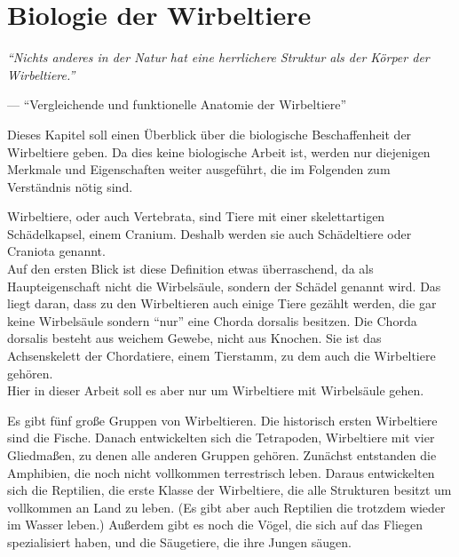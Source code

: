 \chapter{Biologie der Wirbeltiere}
\label{chapter:biology}

\begin{center}
 \begin{minipage}{12cm}
  \emph{"`Nichts anderes in der Natur hat eine herrlichere Struktur als der Körper der Wirbeltiere."'}
 
  --- "`Vergleichende und funktionelle Anatomie der Wirbeltiere"' \cite[S.\ 1]{Vergleichende_Anatomie}
 \end{minipage}
\end{center}

Dieses Kapitel soll einen Überblick über die biologische Beschaffenheit der Wirbeltiere geben. Da dies keine biologische Arbeit ist, werden nur diejenigen Merkmale und Eigenschaften weiter ausgeführt, die im Folgenden zum Verständnis nötig sind.

Wirbeltiere, oder auch Vertebrata, sind Tiere mit einer skelettartigen Schädelkapsel, einem Cranium. Deshalb werden sie auch Schädeltiere oder Craniota genannt.\\
Auf den ersten Blick ist diese Definition etwas überraschend, da als  Haupteigenschaft nicht die Wirbelsäule, sondern der Schädel genannt wird. Das liegt daran, dass zu den Wirbeltieren auch einige Tiere gezählt werden, die gar keine Wirbelsäule sondern "`nur"' eine Chorda dorsalis besitzen. Die Chorda dorsalis besteht aus weichem Gewebe, nicht aus Knochen. Sie ist das Achsenskelett der Chordatiere, einem Tierstamm, zu dem auch die Wirbeltiere gehören. \cite[S.\ 27 f.]{Vergleichende_Anatomie}\\
Hier in dieser Arbeit soll es aber nur um Wirbeltiere mit Wirbelsäule gehen.

Es gibt fünf große Gruppen von Wirbeltieren. Die historisch ersten Wirbeltiere sind die Fische. Danach entwickelten sich die Tetrapoden, Wirbeltiere mit vier Gliedmaßen, zu denen alle anderen Gruppen gehören. Zunächst entstanden die Amphibien, die noch nicht vollkommen terrestrisch leben. Daraus entwickelten sich die Reptilien, die erste Klasse der Wirbeltiere, die alle Strukturen besitzt um vollkommen an Land zu leben. (Es gibt aber auch Reptilien die trotzdem wieder im Wasser leben.) Außerdem gibt es noch die Vögel, die sich auf das Fliegen spezialisiert haben, und die Säugetiere, die ihre Jungen säugen. \cite[Kapitel 4]{Vergleichende_Anatomie}

